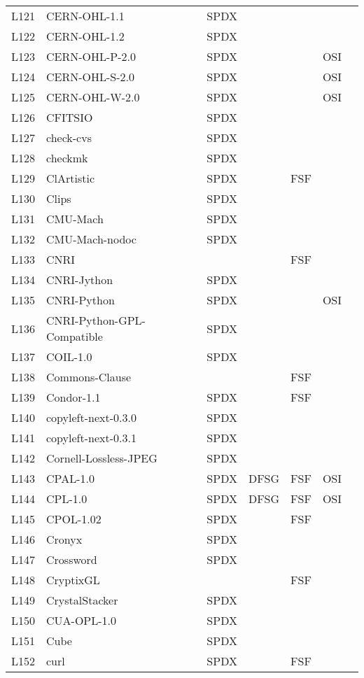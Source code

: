 \begin{longtable}[h]{m{2cm} | m{7cm} | c | c | c | c | c}
L121 & CERN-OHL-1.1 & SPDX &  &  &  &  \\
L122 & CERN-OHL-1.2 & SPDX &  &  &  &  \\
L123 & CERN-OHL-P-2.0 & SPDX &  &  & OSI &  \\
L124 & CERN-OHL-S-2.0 & SPDX &  &  & OSI &  \\
L125 & CERN-OHL-W-2.0 & SPDX &  &  & OSI &  \\
L126 & CFITSIO & SPDX &  &  &  &  \\
L127 & check-cvs & SPDX &  &  &  &  \\
L128 & checkmk & SPDX &  &  &  &  \\
L129 & ClArtistic & SPDX &  & FSF &  &  \\
L130 & Clips & SPDX &  &  &  &  \\
L131 & CMU-Mach & SPDX &  &  &  &  \\
L132 & CMU-Mach-nodoc & SPDX &  &  &  &  \\
L133 & CNRI &  &  & FSF &  &  \\
L134 & CNRI-Jython & SPDX &  &  &  &  \\
L135 & CNRI-Python & SPDX &  &  & OSI &  \\
L136 & CNRI-Python-GPL-Compatible & SPDX &  &  &  &  \\
L137 & COIL-1.0 & SPDX &  &  &  &  \\
L138 & Commons-Clause &  &  & FSF &  &  \\
L139 & Condor-1.1 & SPDX &  & FSF &  &  \\
L140 & copyleft-next-0.3.0 & SPDX &  &  &  &  \\
L141 & copyleft-next-0.3.1 & SPDX &  &  &  &  \\
L142 & Cornell-Lossless-JPEG & SPDX &  &  &  &  \\
L143 & CPAL-1.0 & SPDX & DFSG & FSF & OSI &  \\
L144 & CPL-1.0 & SPDX & DFSG & FSF & OSI &  \\
L145 & CPOL-1.02 & SPDX &  & FSF &  &  \\
L146 & Cronyx & SPDX &  &  &  &  \\
L147 & Crossword & SPDX &  &  &  &  \\
L148 & CryptixGL &  &  & FSF &  &  \\
L149 & CrystalStacker & SPDX &  &  &  &  \\
L150 & CUA-OPL-1.0 & SPDX &  &  &  &  \\
L151 & Cube & SPDX &  &  &  &  \\
L152 & curl & SPDX &  & FSF &  &  \\

\end{longtable}

